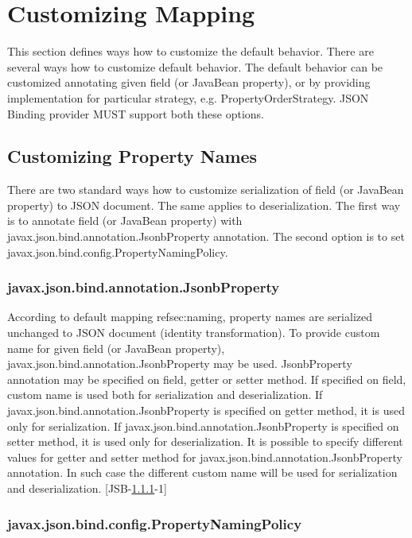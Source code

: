 \chapter{Customizing Mapping}
\label{customization}

This section defines ways how to customize the default behavior. There are several ways how to customize default behavior. The default behavior can be customized annotating given field (or JavaBean property), or by providing implementation for particular strategy, e.g. PropertyOrderStrategy. JSON Binding provider MUST support both these options.

\section{Customizing Property Names}
\label{sec:custom_property_names}

There are two standard ways how to customize serialization of field (or JavaBean property) to JSON document. The same applies to deserialization. The first way is to annotate field (or JavaBean property) with javax.json.bind.annotation.JsonbProperty annotation. The second option is to set javax.json.bind.config.PropertyNamingPolicy.

\subsection{javax.json.bind.annotation.JsonbProperty}
\label{subsec:JsonbProperty}

According to default mapping ref{sec:naming}, property names are serialized unchanged to JSON document (identity transformation). To provide custom name for given field (or JavaBean property), javax.json.bind.annotation.JsonbProperty may be used. JsonbProperty annotation may be specified on field, getter or setter method. If specified on field, custom name is used both for serialization and deserialization. If javax.json.bind.annotation.JsonbProperty is specified on getter method, it is used only for serialization. If javax.json.bind.annotation.JsonbProperty is specified on setter method, it is used only for deserialization. It is possible to specify different values for getter and setter method for javax.json.bind.annotation.JsonbProperty annotation. In such case the different custom name will be used for serialization and deserialization. [JSB-\ref{subsec:JsonbProperty}-1]

\subsection{javax.json.bind.config.PropertyNamingPolicy}
\label{subsec:PropertyNamingPolicy}

